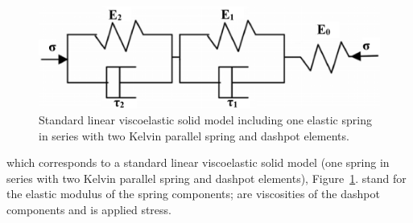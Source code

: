 \documentclass[review]{elsarticle}
\begin{document}
\begin{figure}[hb]
  \centering
  \includegraphics[scale=0.4]{ViscoelasticModel}
  \captionsetup{justification=centering}
  \caption[Close up of \textit{Hemidactylus} sp. ]
   {Standard linear viscoelastic solid model including one elastic spring in series with two Kelvin parallel spring and dashpot elements.}
  \label{fig:ViscoelasticModel}
\end{figure}
which corresponds to a standard linear viscoelastic solid model (one spring in series with two Kelvin parallel spring and dashpot elements), Figure~\ref{fig:ViscoelasticModel}. stand for the elastic modulus of the spring components;  are viscosities of the dashpot components and  is applied stress.
\end{document}
